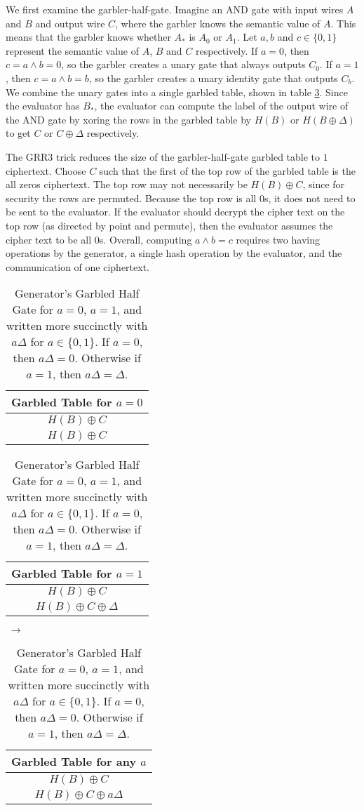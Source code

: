 We first examine the garbler-half-gate.
Imagine an AND gate with input wires $A$ and $B$ and output wire $C$, where the garbler knows the semantic value of $A$.
This means that the garbler knows whether $A_*$ is $A_0$ or $A_1$.
Let $a,b$ and $c \in \{0,1\}$ represent the semantic value of $A$, $B$ and $C$ respectively.
If $a = 0$, then $c = a \wedge b = 0$, so the garbler creates a unary gate that always outputs $C_0$.
If $a = 1$, then $c = a \wedge b = b$, so the garbler creates a unary identity gate that outputs $C_b$.
We combine the unary gates into a single garbled table, shown in table \ref{tbl:halfgate-gg-garb}.
Since the evaluator has $B_*$, the evaluator can compute the label of the output wire of the AND gate by xoring the rows in the garbled table by $H(B)$ or $H(B \oplus \Delta)$ to get $C$ or $C \oplus \Delta$ respectively. 

The GRR3 trick reduces the size of the garbler-half-gate garbled table to $1$ ciphertext.
Choose $C$ such that the first of the top row of the garbled table is the all zeros ciphertext. 
The top row may not necessarily be $H(B) \oplus C$, since for security the rows are permuted. 
Because the top row is all 0s, it does not need to be sent to the evaluator. 
If the evaluator should decrypt the cipher text on the top row (as directed by point and permute), then the evaluator assumes the cipher text to be all 0s. Overall, computing $a \wedge b = c$ requires two having operations by the generator, a single hash operation by the evaluator, and the communication of one ciphertext. 

\begin{table}[]
    \label{tbl:halfgate-gg-garb}
    \centering
    \begin{tabular}{|c|}
        \hline
        Garbled Table for $a = 0$ \\
        \hline
        $H(B) \oplus C$ \\
        $H(B) \oplus C$ \\
        \hline
    \end{tabular}
    \begin{tabular}{|c|}
        \hline
        Garbled Table for $a = 1$ \\
        \hline
        $H(B) \oplus C$ \\
        $H(B) \oplus C \oplus \Delta$ \\
        \hline
    \end{tabular} $\;\rightarrow$
    \begin{tabular}{|c|}
        \hline
        Garbled Table for any $a$ \\
        \hline
        $H(B) \oplus C$ \\
        $H(B) \oplus C \oplus a\Delta$ \\
        \hline
    \end{tabular}
    \caption{Generator's Garbled Half Gate for $a = 0$, $a = 1$, and written more succinctly with $a\Delta$ for $a \in \{0,1\}$. If $a = 0$, then $a\Delta = 0$.  Otherwise if $a = 1$, then $a\Delta = \Delta$.}
\end{table}

